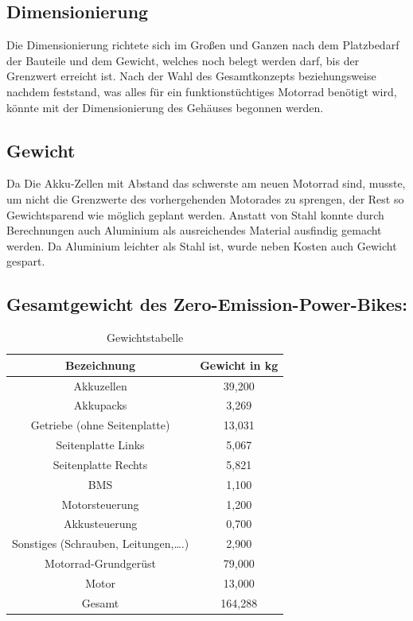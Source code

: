 \newpage

\subsection{Dimensionierung}
Die Dimensionierung richtete sich im Großen und Ganzen nach dem Platzbedarf der Bauteile und dem Gewicht, welches noch belegt werden darf, bis der Grenzwert erreicht ist. Nach der Wahl des Gesamtkonzepts beziehungsweise nachdem feststand, was alles für ein funktionstüchtiges Motorrad benötigt wird, könnte mit der Dimensionierung des Gehäuses begonnen werden. 

\subsection{Gewicht}
Da Die Akku-Zellen mit Abstand das schwerste am neuen Motorrad sind, musste, um nicht die Grenzwerte des vorhergehenden Motorades zu sprengen, der Rest so Gewichtsparend wie möglich geplant werden. Anstatt von Stahl konnte durch Berechnungen auch Aluminium als ausreichendes Material ausfindig gemacht werden. Da Aluminium leichter als Stahl ist, wurde neben Kosten auch Gewicht gespart. 

\subsection{Gesamtgewicht des Zero-Emission-Power-Bikes:}
\begin{table} [H]
	\begin{center}
		\begin{tabular}{|c|c|}
		\hline
		Bezeichnung 						& Gewicht in kg \\ \hline
		Akkuzellen  						& 39,200        \\ \hline
		Akkupacks   						& 3,269         \\ \hline
		Getriebe (ohne Seitenplatte)   	 	& 13,031  		\\ \hline   
		Seitenplatte Links					& 5,067			\\ \hline
		Seitenplatte Rechts					& 5,821			\\ \hline
		BMS									& 1,100			\\ \hline
		Motorsteuerung						& 1,200			\\ \hline
		Akkusteuerung						& 0,700			\\ \hline
		Sonstiges (Schrauben, Leitungen,….) & 2,900			\\ \hline
		Motorrad-Grundgerüst				& 79,000		\\ \hline
		Motor								& 13,000		\\ \hline
		Gesamt								& 164,288		\\ \hline
		\end{tabular}
		\caption{Gewichtstabelle}
	\end{center}
\end{table}


